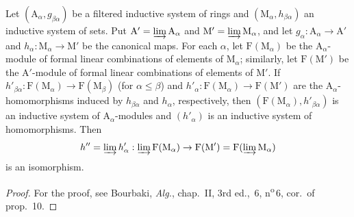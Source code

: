 \begin{lemma}[11.2.2.2]
\label{IV.11.2.2.2}
Let $(\mathrm{A}_\alpha,g_{\beta\alpha})$ be a filtered inductive system
of rings and $(\mathrm{M}_\alpha,h_{\beta\alpha})$ an inductive
system of sets. Put
$\mathrm{A}'=\varinjlim\mathrm{A}_\alpha$ and
$\mathrm{M}'=\varinjlim\mathrm{M}_\alpha$, and let
$g_\alpha:\mathrm{A}_\alpha\to\mathrm{A}'$ and
$h_\alpha:\mathrm{M}_\alpha\to\mathrm{M}'$ be the canonical maps. For
each $\alpha$, let $\mathrm{F}(\mathrm{M}_\alpha)$ be the
$\mathrm{A}_\alpha$-module of formal linear combinations of elements of
$\mathrm{M}_\alpha$; similarly, let $\mathrm{F}(\mathrm{M}')$ be the
$\mathrm{A}'$-module of formal linear combinations of elements of
$\mathrm{M}'$. If
$h'_{\beta\alpha}:\mathrm{F}(\mathrm{M}_\alpha)\to
\mathrm{F}(\mathrm{M}_\beta)$ (for $\alpha\leqslant\beta$) and
$h'_\alpha:\mathrm{F}(\mathrm{M}_\alpha)\to\mathrm{F}(\mathrm{M}')$
are the $\mathrm{A}_\alpha$-homomorphisms induced by
$h_{\beta\alpha}$ and $h_\alpha$, respectively, then
$(\mathrm{F}(\mathrm{M}_\alpha),h'_{\beta\alpha})$ is an inductive
system of $\mathrm{A}_\alpha$-modules and $(h'_\alpha)$ is an inductive
system of homomorphisms. Then
\[
  h''=\varinjlim h'_\alpha:\varinjlim\mathrm{F}(\mathrm{M}_\alpha)\to\mathrm{F}(\mathrm{M}')=\mathrm{F}(\varinjlim\mathrm{M}_\alpha)
\]
is an isomorphism.
\end{lemma}

\begin{proof}
For the proof, see Bourbaki, \emph{Alg.}, chap.~II, 3rd ed., \textsection\,6, n\textsuperscript{o}\,6, cor.\ of prop.~10.
\end{proof}

